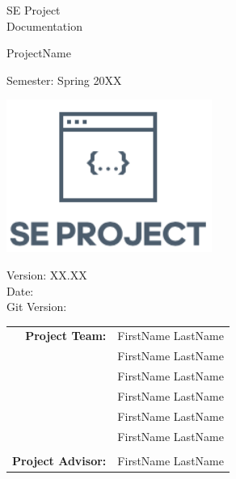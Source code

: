 \begin{titlepage}

    \begin{center}


        \vspace{1 cm}

        {\Large SE Project \\ Documentation} \\

        \vspace{0.5cm}

        {\Huge ProjectName}

        \vspace{0.5cm}

        Semester: Spring 20XX

        \vspace{1 cm}

        \includegraphics[height=5cm]{resources/se-project-logo.png}

        \vspace{1 cm}

        Version: XX.XX \\
        Date: \DTMnow \\
        Git Version: \gitDescription
        \vspace{1 cm}

        \begin{tabular}{rl}
            \textbf{Project Team:}    & FirstName LastName \\
                                      & FirstName LastName \\
                                      & FirstName LastName \\
                                      & FirstName LastName \\
                                      & FirstName LastName \\
                                      & FirstName LastName \\
                                      &                    \\
            \textbf{Project Advisor:} & FirstName LastName
        \end{tabular}


\end{center}
\end{titlepage}
